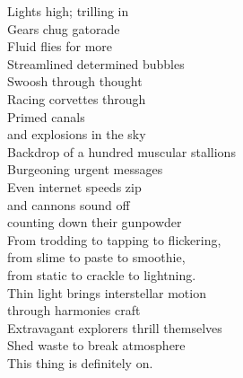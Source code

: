 Lights high; trilling in\\
Gears chug gatorade\\
Fluid flies for more\\
Streamlined determined bubbles\\
Swoosh through thought\\
Racing corvettes through\\
Primed canals\\
and explosions in the sky\\

Backdrop of a hundred muscular stallions\\
Burgeoning urgent messages\\
Even internet speeds zip\\
and cannons sound off\\
counting down their gunpowder\\

From trodding to tapping to flickering,\\
from slime to paste to smoothie,\\
from static to crackle to lightning.\\

Thin light brings interstellar motion\\
through harmonies craft\\
Extravagant explorers thrill themselves\\
Shed waste to break atmosphere\\

This thing is definitely on.\\

